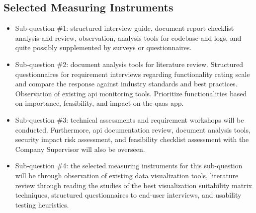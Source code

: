 \begin{multicols}{2}
      \subsection{Selected Measuring Instruments}
      \begin{itemize}[label=-]
            \item Sub-question \#1: structured interview guide, document report checklist analysis and review,
                  observation, analysis tools for codebase and logs, and quite possibly supplemented by surveys
                  or questionnaires.
            \item Sub-question \#2: document analysis tools for literature review. Structured questionnaires for
                  requirement interviews regarding functionality rating scale and compare the response against
                  industry standards and best practices. Observation of existing \acrshort{api} monitoring tools.
                  Prioritize functionalities based on importance, feasibility, and impact on the \acrshort{qaas} app.
            \item Sub-question \#3: technical assessments and requirement workshops will be conducted. Furthermore,
                  \acrshort{api} documentation  review, document analysis tools, security impact risk assessment,
                  and feasibility checklist assessment with the Company Supervisor will also be overseen.
            \item Sub-question \#4: the selected measuring instruments for this sub-question will be through
                  observation of existing data visualization tools, literature review through reading the studies of
                  the best visualization suitability matrix techniques, structured questionnaires to end-user
                  interviews, and usability testing heuristics.
      \end{itemize}

\end{multicols}
